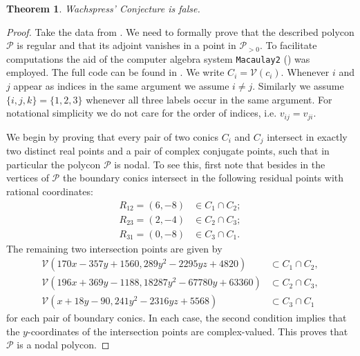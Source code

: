 \documentclass[a4paper,10pt]{amsart}
\theoremstyle{definition}
\theoremstyle{plain}
\newtheorem{thm}[defin]{Theorem}
\newcommand{\cP}{{\mathcal P}}
\newcommand{\cV}{{\mathcal V}}
\begin{document}
\begin{thm} \label{thm: WachspressWrong}
 Wachspress' Conjecture is false.
\end{thm}

\begin{proof}
 Take the data from . We need to formally prove that the described polycon $\cP$ is regular and that its adjoint vanishes in a point in $\cP_{>0}$. To facilitate computations the aid of the computer algebra system \texttt{Macaulay2} (\cite{M2}) was employed. The full code can be found in . We write $C_i = \cV(c_i)$. Whenever $i$ and $j$ appear as indices in the same argument we assume $i \neq j$. Similarly we assume $\{i,j,k\} = \{1,2,3\}$ whenever all three labels occur in the same argument. For notational simplicity we do not care for the order of indices, i.e. $v_{ij} = v_{ji}$.
 
 We begin by proving that every pair of two conics $C_i$ and $C_j$ intersect in exactly two distinct real points and a pair of complex conjugate points, such that in particular the polycon $\cP$ is nodal. To see this, first note that besides in the vertices of $\cP$ the boundary conics intersect in the following residual points with rational coordinates:
 \begin{equation*}
 \begin{split}
     R_{12} = (6,-8) &\in C_1 \cap C_2; \\
     R_{23} = (2,-4) &\in C_2 \cap C_3; \\
     R_{31} = (0,-8) &\in C_3 \cap C_1.
 \end{split}
 \end{equation*}
 The remaining two intersection points are given by
 \begin{equation*}
 \begin{split}
     \cV(170x-357y+1560, 289y^2-2295yz+4820) &\subset C_1 \cap C_2, \\
     \cV(196x+369y-1188, 18287y^2-67780y+63360) &\subset C_2 \cap C_3, \\
     \cV(x+18y-90, 241y^2-2316yz+5568) &\subset C_3 \cap C_1
 \end{split}
 \end{equation*}
 for each pair of boundary conics. In each case, the second condition implies that the $y$-coordinates of the intersection points are complex-valued. This proves that $\cP$ is a nodal polycon.
 

\end{proof}
\end{document}

